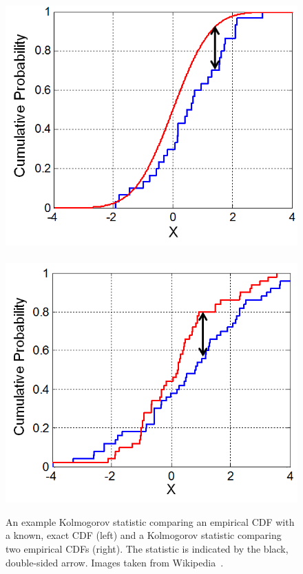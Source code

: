 \begin{figure}
\includegraphics[width=0.45\linewidth]{figs/KS_Example.png}~~~
\includegraphics[width=0.45\linewidth]{figs/KS2_Example.png}
\caption{An example Kolmogorov statistic comparing an empirical CDF
with a known, exact CDF (left)  and a Kolmogorov statistic comparing
two empirical CDFs (right). The statistic is indicated by the black,
double-sided arrow. Images taken from 
Wikipedia~\cite{Wiki_kolm}.}
\label{fig:kolm}
\end{figure}

